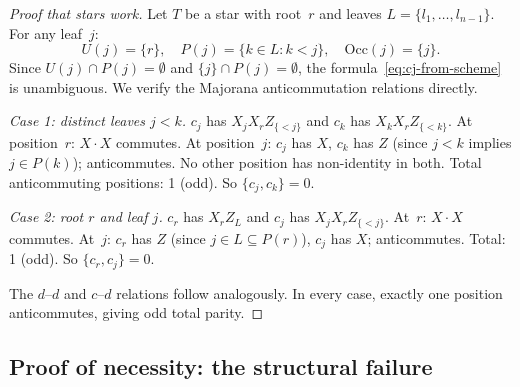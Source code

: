 \begin{proof}[Proof that stars work]
Let $T$ be a star with root~$r$ and leaves $L = \{l_1, \ldots,
l_{n-1}\}$.  For any leaf~$j$:
\[
  U(j) = \{r\}, \quad
  P(j) = \{k \in L : k < j\}, \quad
  \mathrm{Occ}(j) = \{j\}.
\]
Since $U(j) \cap P(j) = \emptyset$ and $\{j\} \cap P(j) = \emptyset$,
the formula~\eqref{eq:cj-from-scheme} is unambiguous.  We verify the
Majorana anticommutation relations directly.

\emph{Case 1: distinct leaves $j < k$.}
$c_j$ has $X_j X_r Z_{\{<j\}}$ and $c_k$ has $X_k X_r Z_{\{<k\}}$.
At position~$r$: $X \cdot X$ commutes.  At position~$j$: $c_j$ has
$X$, $c_k$ has $Z$ (since $j < k$ implies $j \in P(k)$);
anticommutes.  No other position has non-identity in both.  Total
anticommuting positions: 1 (odd).  So $\{c_j, c_k\} = 0$. \checkmark

\emph{Case 2: root $r$ and leaf $j$.}
$c_r$ has $X_r Z_L$ and $c_j$ has $X_j X_r Z_{\{<j\}}$.
At~$r$: $X \cdot X$ commutes.  At~$j$: $c_r$ has $Z$ (since
$j \in L \subseteq P(r)$), $c_j$ has $X$; anticommutes.  Total: 1
(odd).  So $\{c_r, c_j\} = 0$. \checkmark

The $d$--$d$ and $c$--$d$ relations follow analogously.  In every
case, exactly one position anticommutes, giving odd total parity.
\end{proof}

\subsection{Proof of necessity: the structural failure}

